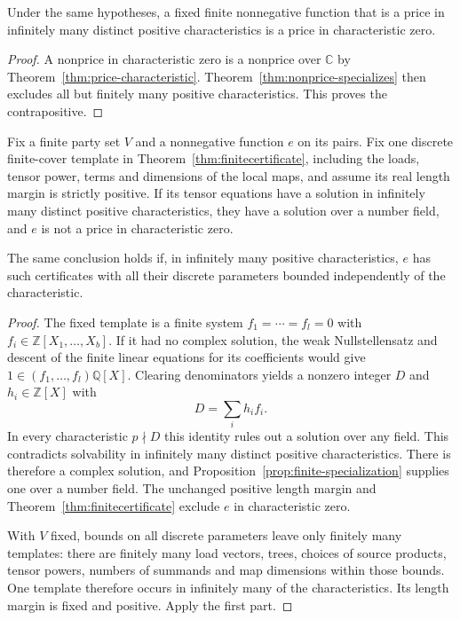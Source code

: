 \begin{corollary}
\label{cor:infinitely-many-price-characteristics}
Under the same hypotheses, a fixed finite nonnegative function
that is a price in infinitely many distinct positive
characteristics is a price in characteristic zero.
\end{corollary}

\begin{proof}
A nonprice in characteristic zero is a nonprice over
$\mathbb C$ by Theorem~\ref{thm:price-characteristic}.
Theorem~\ref{thm:nonprice-specializes} then excludes all but
finitely many positive characteristics.  This proves the
contrapositive.
\end{proof}

\begin{proposition}
\label{prop:bounded-certificates-lift}
Fix a finite party set $V$ and a nonnegative function $e$ on its
pairs.  Fix one discrete finite-cover template in
Theorem~\ref{thm:finitecertificate}, including the loads,
tensor power, terms and dimensions of the local maps, and assume
its real length margin is strictly positive.  If its tensor
equations have a solution in infinitely many distinct positive
characteristics, they have a solution over a number field, and
$e$ is not a price in characteristic zero.

The same conclusion holds if, in infinitely many positive
characteristics, $e$ has such certificates with all their
discrete parameters bounded independently of the characteristic.
\end{proposition}

\begin{proof}
The fixed template is a finite system
$f_1=\cdots=f_l=0$ with $f_i\in\mathbb Z[X_1,\ldots,X_b]$.
If it had no complex solution, the weak Nullstellensatz and
descent of the finite linear equations for its coefficients
would give $1\in(f_1,\ldots,f_l)\mathbb Q[X]$.
Clearing denominators yields a nonzero integer $D$ and
$h_i\in\mathbb Z[X]$ with
\[
 D=\sum_i h_if_i.
\]
In every characteristic $p\nmid D$ this identity rules out a
solution over any field.  This contradicts solvability in
infinitely many distinct positive characteristics.
There is therefore a complex solution, and
Proposition~\ref{prop:finite-specialization} supplies one
over a number field.  The unchanged positive length margin
and Theorem~\ref{thm:finitecertificate} exclude $e$ in
characteristic zero.

With $V$ fixed, bounds on all discrete parameters leave only
finitely many templates: there are finitely many load vectors,
trees, choices of source products, tensor powers, numbers of
summands and map dimensions within those bounds.  One template
therefore occurs in infinitely many of the characteristics.
Its length margin is fixed and positive.  Apply the first part.
\end{proof}

